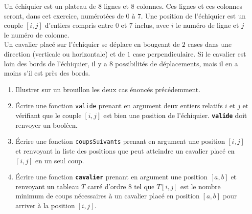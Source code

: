 \begin{exercice}
Un échiquier est un plateau de $8$ lignes et $8$ colonnes. Ces lignes et ces colonnes seront, dans cet exercice, numérotées de $0$ à $7$. Une position de l'échiquier est un couple $[i,j]$ d'entiers compris entre $0$ et $7$ inclus, avec $i$ le numéro de ligne et $j$ le numéro de colonne.\\
Un cavalier placé sur l'échiquier se déplace en bougeant de $2$ cases dans une direction (verticale ou horizontale) et de $1$ case perpendiculaire. Si le cavalier est loin des bords de l'échiquier, il y a $8$ possibilités de déplacements, mais il en a moins s'il est près des bords.
\begin{enumerate}
\item Illustrer sur un brouillon les deux cas énoncés précédemment.
\item \'Ecrire une fonction \texttt{valide} prenant en argument deux entiers relatifs $i$ et $j$ et vérifiant que le couple $[i,j]$ est bien une position de l'échiquier. \textbf{\texttt{valide}} doit renvoyer un booléen.
\item \'Ecrire une fonction \texttt{coupsSuivants} prenant en argument une position $[i,j]$ et renvoyant la liste des positions que peut atteindre un cavalier placé en $[i,j]$ en un seul coup. 
\item \'Ecrire une fonction \texttt{\textbf{cavalier}} prenant en argument une position $[a,b]$ et renvoyant un tableau $T$ carré d'ordre $8$ tel que $T[i,j]$ est le nombre minimum de coups nécessaires à un cavalier placé en position $[a,b]$ pour arriver à la position $[i,j]$.
\end{enumerate}
\end{exercice}
